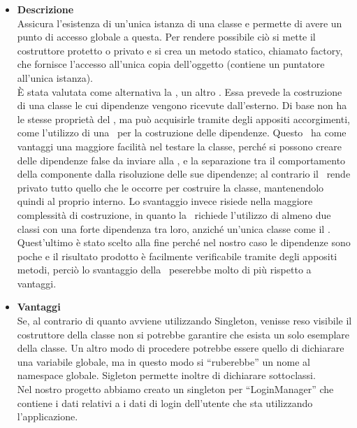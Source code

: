 		\begin{itemize}
			\item \textbf{Descrizione}\\ 
			 Assicura l'esistenza di un'unica istanza di una classe e permette di avere un punto di accesso globale a questa.
			 Per rendere possibile ciò si mette il costruttore protetto o privato e si crea un metodo statico, chiamato factory, che fornisce l’accesso all'unica copia dell’oggetto (contiene un puntatore all’unica istanza). \\
			 È stata valutata come alternativa la , un altro . Essa prevede la costruzione di una classe le cui dipendenze vengono ricevute dall'esterno. Di base non ha le stesse proprietà del , ma può acquisirle tramite degli appositi accorgimenti, come l'utilizzo di una \ per la costruzione delle dipendenze. Questo \ ha come vantaggi una maggiore facilità nel testare la classe, perché si possono creare delle dipendenze false da inviare alla , e la separazione tra il comportamento della componente dalla risoluzione delle sue dipendenze; al contrario il \ rende privato tutto quello che le occorre per costruire la classe, mantenendolo quindi al proprio interno. Lo svantaggio invece risiede nella maggiore complessità di costruzione, in quanto la \ richiede l'utilizzo di almeno due classi con una forte dipendenza tra loro, anziché un'unica classe come il . Quest'ultimo è stato scelto alla fine perché nel nostro caso le dipendenze sono poche e il risultato prodotto è facilmente verificabile tramite degli appositi metodi, perciò lo svantaggio della \ peserebbe molto di più rispetto a vantaggi.
			 \item \textbf{Vantaggi}\\ 
			 Se, al contrario di quanto avviene utilizzando Singleton, venisse reso visibile il costruttore della classe non si potrebbe garantire che esista un solo esemplare della classe. Un altro modo di procedere potrebbe essere quello di dichiarare una variabile globale, ma in questo modo si ``ruberebbe'' un nome al namespace globale.
			 Sigleton permette inoltre di dichiarare sottoclassi.			 
			 \utilizzo \\ 
			 Nel nostro progetto abbiamo creato un singleton per ``LoginManager'' che contiene i dati relativi a i dati di login dell'utente che sta utilizzando l'applicazione.
			 

\end{itemize}
